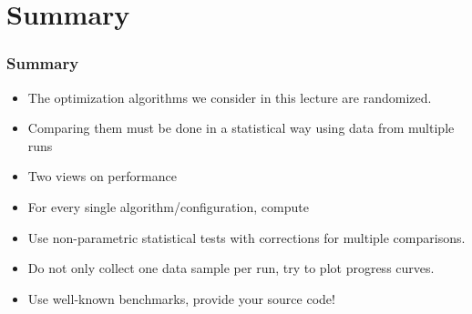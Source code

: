 \documentclass[aspectratio=169,mathserif,notheorems]{beamer}%
\begin{document}
\section{Summary}%
%
\begin{frame}\frametitle{Summary}%
\begin{itemize}%
\item The optimization algorithms we consider in this lecture are \alert<1>{randomized}.%
%
\item<2-> Comparing them must be done in a \alert<2>{statistical way} using data from \alert<2>{multiple runs}%
\item<3-> Two views on performance%
%
%
\item<6-> For every single algorithm/configuration, compute%
%
\item<11-> Use non-parametric statistical tests with corrections for multiple comparisons.%
%
\item<12-> Do not only collect one data sample per run, try to plot progress curves.%
%
\item<13-> Use well-known benchmarks, provide your source code!%
%
\end{itemize}%
\end{frame}%
%
%
%
\endPresentation%
\end{document}
